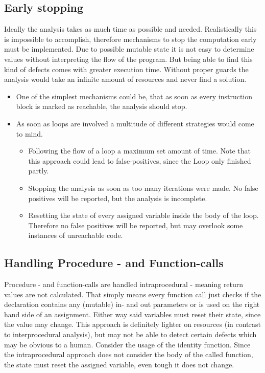 \subsection{Early stopping}
\label{sub:early stopping}
Ideally the analysis takes as much time as possible and needed. Realistically this is impossible to accomplish, therefore mechanisms to stop the computation early must be implemented.
Due to possible mutable state it is not easy to determine values without interpreting the flow of the program. 
But being able to find this kind of defects comes with greater execution time. Without proper guards the analysis would take an infinite amount of resources and never find a solution.
\begin{itemize}
	\item One of the simplest mechanisms could be, that as soon as every instruction block is marked as reachable, the analysis should stop.
	\item As soon as loops are involved a multitude of different strategies would come to mind. 
	\begin{itemize}
		\item Following the flow of a loop a maximum set amount of time. Note that this approach could lead to false-positives, since the Loop only finished partly. 
		\item Stopping the analysis as soon as too many iterations were made. No false positives will be reported, but the analysis is incomplete.
		\item Resetting the state of every assigned variable inside the body of the loop. Therefore no false positives will be reported, but may overlook some instances of unreachable code.
	\end{itemize}
\end{itemize}

\subsection{Handling Procedure - and Function-calls}
\label{sub:handling procedure and function calls}
Procedure - and function-calls are handled intraprocedural - meaning return values are not calculated. That simply means every function call just checks if the declaration contains any (mutable) in- and out parameters or is used on the right hand side of an assignment.
Either way said variables must reset their state, since the value may change. 
This approach is definitely lighter on resources (in contrast to interprocedural analysis), but may not be able to detect certain defects which may be obvious to a human. Consider the usage of the identity function. Since the intraprocedural approach does not consider the body of the called function, the state must reset the assigned variable, even tough it does not change.

